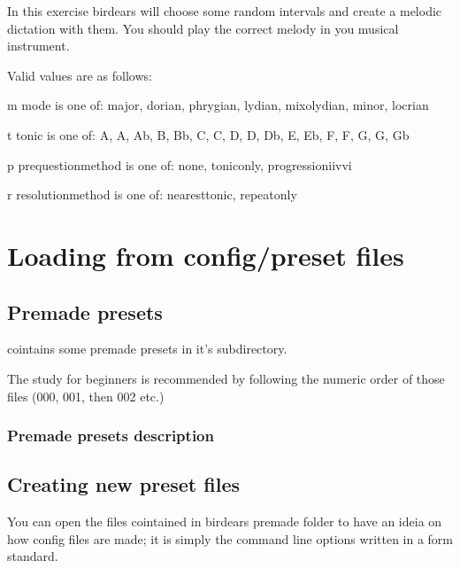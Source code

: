 \documentclass[letterpaper,10pt,english]{sphinxmanual}
\begin{document}
\begin{sphinxVerbatim}[commandchars=\\\{\}]
  In this exercise birdears will choose some random intervals and create a
  melodic dictation with them. You should play the correct melody in you
  musical instrument.

  Valid values are as follows:

  \PYGZhy{}m \PYGZlt{}mode\PYGZgt{} is one of: major, dorian, phrygian, lydian, mixolydian, minor,
  locrian

  \PYGZhy{}t \PYGZlt{}tonic\PYGZgt{} is one of: A, A\PYGZsh{}, Ab, B, Bb, C, C\PYGZsh{}, D, D\PYGZsh{}, Db, E, Eb, F, F\PYGZsh{}, G,
  G\PYGZsh{}, Gb

  \PYGZhy{}p \PYGZlt{}prequestion\PYGZus{}method\PYGZgt{} is one of: none, tonic\PYGZus{}only, progression\PYGZus{}i\PYGZus{}iv\PYGZus{}v\PYGZus{}i

  \PYGZhy{}r \PYGZlt{}resolution\PYGZus{}method\PYGZgt{} is one of: nearest\PYGZus{}tonic, repeat\PYGZus{}only
\end{sphinxVerbatim}


\section{Loading from config/preset files}
\label{\detokenize{using:loading-from-config-preset-files}}

\subsection{Pre\sphinxhyphen{}made presets}
\label{\detokenize{using:pre-made-presets}}
\sphinxAtStartPar
{} cointains some pre\sphinxhyphen{}made presets in it’s 
subdirectory.

\sphinxAtStartPar
The study for beginners is recommended by following the numeric order of
those files (000, 001, then 002 etc.)


\subsubsection{Pre\sphinxhyphen{}made presets description}
\label{\detokenize{using:pre-made-presets-description}}
\sphinxAtStartPar
{}


\subsection{Creating new preset files}
\label{\detokenize{using:creating-new-preset-files}}
\sphinxAtStartPar
You can open the files cointained in birdears premade 
folder to have an ideia on how config files are made; it is simply the
command line options written in a form  standard.
\end{document}
